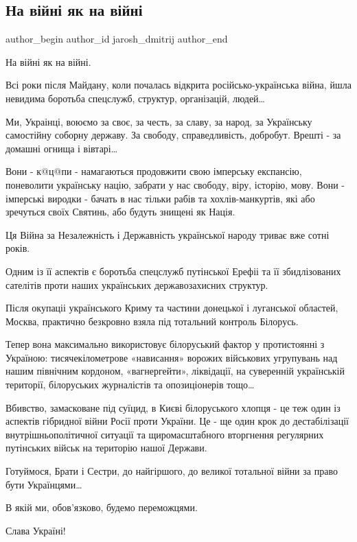  
 
 
 
 
 
\subsection{На війні як на війні}
\label{sec:03_08_2021.fb.jarosh_dmitrij.1.a_la_guerre}
 
\ifcmt
 author_begin
   author_id jarosh_dmitrij
 author_end
\fi

На війні як на війні.

Всі роки після Майдану, коли почалась відкрита російсько-українська війна, йшла
невидима боротьба спецслужб, структур, організацій, людей…

Ми, Украінці, воюємо за своє, за честь, за славу, за народ, за Українську
самостійну соборну державу. За свободу, справедливість,  добробут. Врешті - за
домашні огнища і вівтарі…

Вони - к@ц@пи - намагаються продовжити свою імперську експансію, поневолити
українську націю, забрати у нас свободу, віру, історію, мову. Вони - імперські
виродки - бачать в нас тільки рабів та хохлів-манкуртів, які або зречуться
своїх Святинь, або будуть знищені як Нація.

Ця Війна за Незалежність і Державність української народу триває вже сотні
років.

Одним із її аспектів є боротьба спецслужб путінської Ерефіі та її збидлізованих
сателітів проти наших українських державозахисних структур.

Після окупаціі українського Криму та частини донецької і луганської областей,
Москва, практично безкровно взяла під тотальний контроль Білорусь. 

Тепер вона максимально використовує білоруський фактор у протистоянні  з
Україною: тисячекілометрове «нависання» ворожих військових угрупувань над нашим
північним кордоном, «вагнергейти», ліквідації, на суверенній українській
території, білоруських журналістів та опозиціонерів тощо…

Вбивство, замасковане під суїцид, в Києві білоруського хлопця - це теж один із
аспектів гібридної війни Росії проти України. Це - ще один крок до
дестабілізації внутрішньополітичної ситуації та щиромасштабного вторгнення
регулярних путінських військ на територію нашої Держави.

Готуймося, Брати і Сестри, до найгіршого, до великої тотальної  війни за право
бути Українцями…

В якій ми, обов’язково, будемо переможцями.

Слава Україні!

